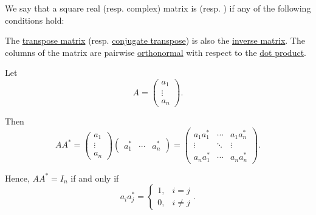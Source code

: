 \begin{definition}\label{def:unitary_matrix}
  We say that a square real (resp. complex) matrix is  (resp. ) if any of the following conditions hold:
  \begin{thmenum}
     The \hyperref[def:transpose_matrix]{transpose matrix} (resp. \hyperref[def:conjugate_transpose]{conjugate transpose}) is also the \hyperref[def:inverse_matrix]{inverse matrix}.
     The columns of the matrix are pairwise \hyperref[def:orthogonality]{orthonormal} with respect to the \hyperref[def:inner_product_space]{dot product}.
  \end{thmenum}
\end{definition}
\begin{defproof}
   Let
  \begin{equation*}
    A = \begin{pmatrix} a_1 \\ \vdots \\ a_n \end{pmatrix}.
  \end{equation*}

  Then
  \begin{equation*}
    A A^*
    =
    \begin{pmatrix} a_1 \\ \vdots \\ a_n \end{pmatrix}
    \begin{pmatrix} a_1^* & \cdots & a_n^* \end{pmatrix}
    =
    \begin{pmatrix}
      a_1 a_1^*  & \cdots & a_1 a_n^* \\
      \vdots     & \ddots & \vdots \\
      a_n a_1^*  & \cdots & a_n a_n^*
    \end{pmatrix}.
  \end{equation*}

  Hence, \( A A^* = I_n \) if and only if
  \begin{equation*}
    a_i a_j^* = \begin{cases}
      1, &i = j \\
      0, &i \neq j
    \end{cases}.
  \end{equation*}
\end{defproof}

